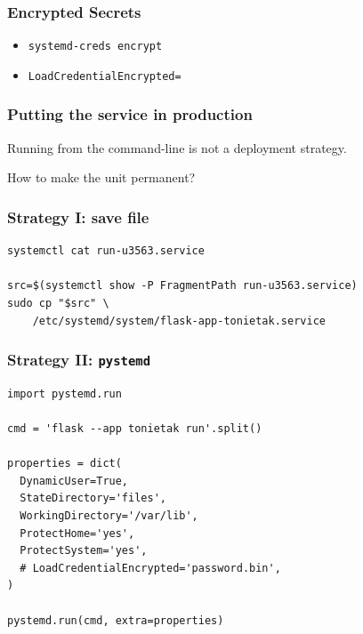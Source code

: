 \documentclass[]{beamer}
\begin{document}
\begin{frame}
  \frametitle{Encrypted Secrets}

  \begin{itemize}
  \item \texttt{systemd-creds encrypt}
  \item \texttt{LoadCredentialEncrypted=}

  \end{itemize}
\end{frame}

\begin{frame}
  \frametitle{Putting the service in production}

  Running from the command-line is not a deployment strategy.

  How to make the unit permanent?
\end{frame}

\begin{frame}[fragile]
  \frametitle{Strategy I: save file}

  \begin{verbatim}
systemctl cat run-u3563.service

src=$(systemctl show -P FragmentPath run-u3563.service)
sudo cp "$src" \
    /etc/systemd/system/flask-app-tonietak.service
\end{verbatim}
\end{frame}

\begin{frame}[fragile]
  \frametitle{Strategy II: \texttt{pystemd}}

  \begin{verbatim}
import pystemd.run

cmd = 'flask --app tonietak run'.split()

properties = dict(
  DynamicUser=True,
  StateDirectory='files',
  WorkingDirectory='/var/lib',
  ProtectHome='yes',
  ProtectSystem='yes',
  # LoadCredentialEncrypted='password.bin',
)

pystemd.run(cmd, extra=properties)
  \end{verbatim}
\end{frame}
\end{document}

